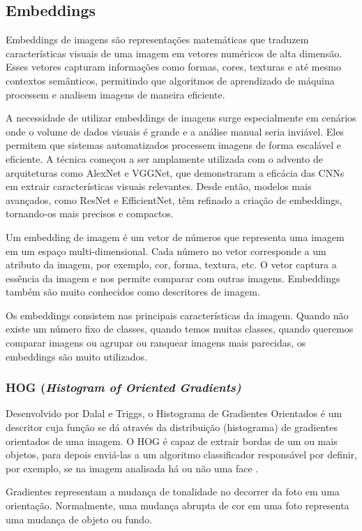 \documentclass[12pt]{article}
\begin{document}
\subsection{Embeddings}

Embeddings de imagens são representações matemáticas que traduzem características visuais de uma imagem em vetores numéricos de alta dimensão. Esses vetores capturam informações como formas, cores, texturas e até mesmo contextos semânticos, permitindo que algoritmos de aprendizado de máquina processem e analisem imagens de maneira eficiente.

A necessidade de utilizar embeddings de imagens surge especialmente em cenários onde o volume de dados visuais é grande e a análise manual seria inviável. Eles permitem que sistemas automatizados processem imagens de forma escalável e eficiente. A técnica começou a ser amplamente utilizada com o advento de arquiteturas como AlexNet e VGGNet, que demonstraram a eficácia das CNNs em extrair características visuais relevantes. Desde então, modelos mais avançados, como ResNet e EfficientNet, têm refinado a criação de embeddings, tornando-os mais precisos e compactos.

Um embedding de imagem é um vetor de números que representa uma imagem em um espaço multi-dimensional. Cada número no vetor corresponde a um atributo da imagem, por exemplo, cor, forma, textura, etc. O vetor captura a essência da imagem e nos permite comparar com outras imagens. Embeddings também são muito conhecidos como descritores de imagem. 

Os embeddings consistem nas principais características da imagem. Quando não existe um número fixo de classes, quando temos muitas classes, quando queremos comparar imagens ou agrupar ou ranquear imagens mais parecidas, os embeddings são muito utilizados.

\subsubsection{HOG (\textit{Histogram of Oriented Gradients)}}
Desenvolvido por Dalal e Triggs, o Histograma de Gradientes Orientados é um descritor cuja função se dá através da distribuição (histograma) de gradientes orientados de uma imagem. O HOG é capaz de extrair bordas de um ou mais objetos, para depois enviá-las a um algoritmo classificador responsável por definir, por exemplo, se na imagem analisada há ou não uma face \cite{DilermandoErick2022}.

Gradientes representam a mudança de tonalidade no decorrer da foto em uma orientação. Normalmente, uma mudança abrupta de cor em uma foto representa uma mudança de objeto ou fundo.
\end{document}
